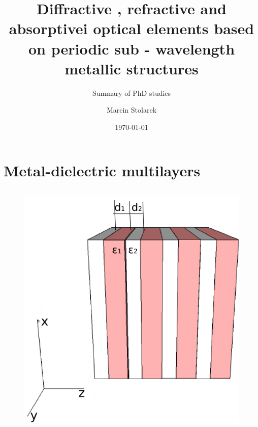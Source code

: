 \documentclass{beamer}
\title{Diffractive , refractive and absorptivei optical elements based on periodic sub - wavelength metallic structures}
\subtitle{Summary of PhD studies}
\author{Marcin Stolarek}
\institute{Information Optics Division, Faculty of Physics}
\date{\today}
\begin{document}
\renewcommand*{\bibfont}{\tiny}

\frame{\titlepage}

\frame{\tableofcontents}

\section{Metal-dielectric multilayers}
\begin{frame}
	\begin{columns}
		\begin{column}{0.5\textwidth}
			\begin{figure}[htb]
				\includegraphics[width=\textwidth]{../images/multilayer/multilayer-3d.png}\\
			

\end{figure}
\end{column}
\end{columns}
\end{frame}
\end{document}
